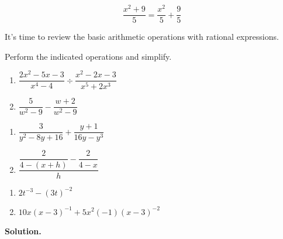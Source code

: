 \documentclass{ximera}
\begin{document}
\[ \dfrac{x^2+9}{5} = \dfrac{x^2}{5} + \dfrac{9}{5} \] 

It's time to review the basic arithmetic operations with rational expressions. 

\pagebreak

\begin{example} \label{rationalexpressionreviewex} Perform the indicated operations and simplify.

\begin{multicols}{2}
\begin{enumerate}

\item  $\dfrac{2x^2-5x-3}{x^4 - 4} \div \dfrac{x^2-2x-3}{x^5 + 2x^3}$

\item  $\dfrac{5}{w^2 - 9} - \dfrac{w+2}{w^2-9}$

\setcounter{HW}{\value{enumi}}
\end{enumerate}

\end{multicols}

\begin{multicols}{2}
\begin{enumerate}
\setcounter{enumi}{\value{HW}}

\item  $\dfrac{3}{y^2 - 8y + 16} + \dfrac{y+1}{16y - y^3}$

\item  $\dfrac{\dfrac{2}{4 - (x+h)} - \dfrac{2}{4-x}}{h}$

\setcounter{HW}{\value{enumi}}
\end{enumerate}

\end{multicols}

\begin{multicols}{2}
\begin{enumerate}
\setcounter{enumi}{\value{HW}}

\item  $2t^{-3} - (3t)^{-2}$

\item  $10x(x-3)^{-1} + 5x^2(-1)(x-3)^{-2}$

\setcounter{HW}{\value{enumi}}
\end{enumerate}

\end{multicols}

{\bf Solution.}


\end{example}
\end{document}
